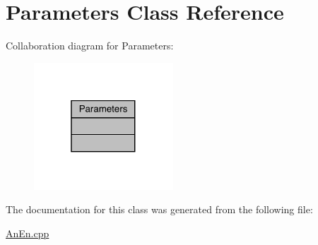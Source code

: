 \hypertarget{class_parameters}{}\section{Parameters Class Reference}
\label{class_parameters}


Collaboration diagram for Parameters\+:
\nopagebreak
\begin{figure}[H]
\begin{center}
\leavevmode
\includegraphics[width=148pt]{class_parameters__coll__graph}
\end{center}
\end{figure}


The documentation for this class was generated from the following file\+:\begin{DoxyCompactItemize}
\item 
\mbox{\hyperlink{_an_en_8cpp}{An\+En.\+cpp}}\end{DoxyCompactItemize}
